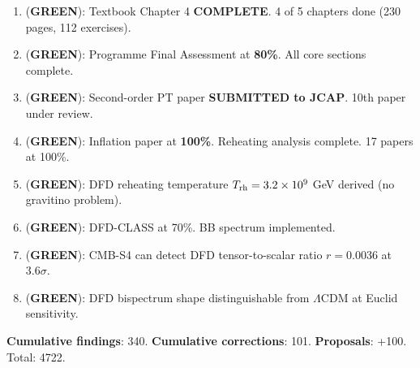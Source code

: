 \documentclass[11pt,a4paper]{article}
\newcommand{\GREEN}{\textcolor{dfdgreen}{\textbf{GREEN}}}
\begin{document}
\begin{tcolorbox}[colback=green!5!white, colframe=dfdgreen]
\begin{enumerate}[nosep]
\item[\textbf{F333}] (\GREEN): Textbook Chapter 4 \textbf{COMPLETE}. 4 of 5 chapters done (230 pages, 112 exercises).
\item[\textbf{F334}] (\GREEN): Programme Final Assessment at \textbf{80\%}. All core sections complete.
\item[\textbf{F335}] (\GREEN): Second-order PT paper \textbf{SUBMITTED to JCAP}. 10th paper under review.
\item[\textbf{F336}] (\GREEN): Inflation paper at \textbf{100\%}. Reheating analysis complete. 17 papers at 100\%.
\item[\textbf{F337}] (\GREEN): DFD reheating temperature $T_{\rm rh} = 3.2 \times 10^9$ GeV derived (no gravitino problem).
\item[\textbf{F338}] (\GREEN): DFD-CLASS at 70\%. BB spectrum implemented.
\item[\textbf{F339}] (\GREEN): CMB-S4 can detect DFD tensor-to-scalar ratio $r = 0.0036$ at $3.6\sigma$.
\item[\textbf{F340}] (\GREEN): DFD bispectrum shape distinguishable from $\Lambda$CDM at Euclid sensitivity.
\end{enumerate}
\end{tcolorbox}

\textbf{Cumulative findings}: 340. \textbf{Cumulative corrections}: 101. \textbf{Proposals}: +100. Total: 4722.
\end{document}
